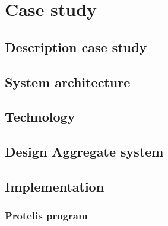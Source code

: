 \chapter{Case study}
\label{chap:case-staudyAC}
\section{Description case study}


\section{System architecture}


\section{Technology}
\section{Design Aggregate system}
\section{Implementation}
\subsection{Protelis program}